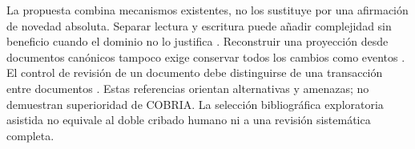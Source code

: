 La propuesta combina mecanismos existentes, no los sustituye por una
afirmación de novedad absoluta. Separar lectura y escritura puede añadir complejidad
sin beneficio cuando el dominio no lo justifica \parencite{fowler2011cqrs}.
Reconstruir una proyección desde documentos canónicos tampoco exige conservar todos
los cambios como eventos \parencite{fowler2005eventsourcing}. El control de revisión
de un documento debe distinguirse de una transacción entre documentos
\parencite{apacheCouchDocumentApi}. Estas referencias orientan alternativas y amenazas;
no demuestran superioridad de COBRIA. La selección bibliográfica exploratoria asistida
no equivale al doble cribado humano ni a una revisión sistemática completa.
